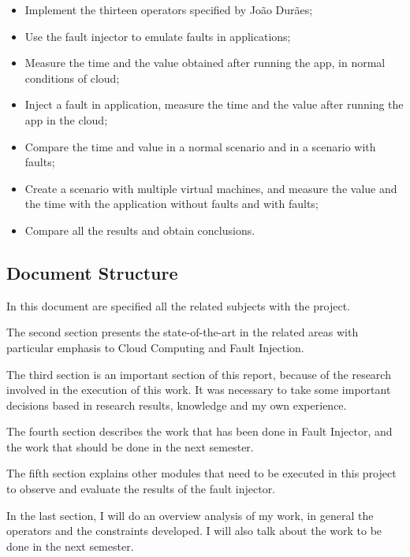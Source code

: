 \begin{itemize}
	\item Implement the thirteen operators specified by João Durães;
	\item Use the fault injector to emulate faults in applications;
	\item Measure the time and the value obtained after running the app, in normal conditions of cloud;
	\item Inject a fault in application, measure the time and the value after running the app in the cloud;
	\item Compare the time and value in a normal scenario and in a scenario with faults;
	\item Create a scenario with multiple virtual machines, and measure the value and the time with the application without faults and with faults;
	\item Compare all the results and obtain conclusions.

\end{itemize}


\subsection{Document Structure}

In this document are specified all the related subjects with the project.

The second section presents the state-of-the-art in the related areas with particular emphasis to Cloud Computing and Fault Injection.

The third section is an important section of this report, because of the research involved in the execution of this work. It was necessary to take some important decisions based in research results, knowledge and my own experience.

The fourth section describes the work that has been done in Fault Injector, and the work that should be done in the next semester.

The fifth section explains other modules that need to be executed in this project to observe and evaluate the results of the fault injector.

In the last section, I will do an overview analysis of my work, in general the operators and the constraints developed. I will also talk about the work to be done in the next semester.

